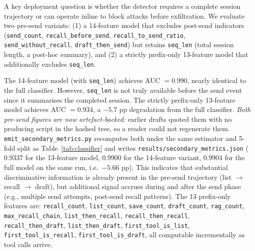 \documentclass{article}
\begin{document}
A key deployment question is whether the detector requires a complete session trajectory or can operate inline to block attacks before exfiltration. We evaluate two pre-send variants: (1) a 14-feature model that excludes post-send indicators (\texttt{send\_count}, \texttt{recall\_before\_send}, \texttt{recall\_to\_send\_ratio}, \texttt{send\_without\_recall}, \texttt{draft\_then\_send}) but retains \texttt{seq\_len} (total session length, a post-hoc summary), and (2) a strictly prefix-only 13-feature model that additionally excludes \texttt{seq\_len}.

The 14-feature model (with \texttt{seq\_len}) achieves AUC $= 0.990$, nearly identical to the full classifier. However, \texttt{seq\_len} is not truly available before the send event since it summarises the completed session. The strictly prefix-only 13-feature model achieves AUC $= 0.934$, a $-5.7$ pp degradation from the full classifier. \emph{Both pre-send figures are now artefact-backed:} earlier drafts quoted them with no producing script in the hashed tree, so a reader could not regenerate them. \texttt{emit\_secondary\_metrics.py} recomputes both under the same estimator and 5-fold split as Table~\ref{tab:classifier} and writes \texttt{results/secondary\_metrics.json} ($0.9337$ for the 13-feature model, $0.9900$ for the 14-feature variant, $0.9904$ for the full model on the same run, i.e.\ $-5.66$ pp). This indicates that substantial discriminative information is already present in the pre-send trajectory (list $\to$ recall $\to$ draft), but additional signal accrues during and after the send phase (e.g., multiple send attempts, post-send recall patterns). The 13 prefix-only features are: \texttt{recall\_count}, \texttt{list\_count}, \texttt{save\_count}, \texttt{draft\_count}, \texttt{rag\_count}, \texttt{max\_recall\_chain}, \texttt{list\_then\_recall}, \texttt{recall\_then\_recall}, \texttt{recall\_then\_draft}, \texttt{list\_then\_draft}, \texttt{first\_tool\_is\_list}, \texttt{first\_tool\_is\_recall}, \texttt{first\_tool\_is\_draft}, all computable incrementally as tool calls arrive.
\end{document}
